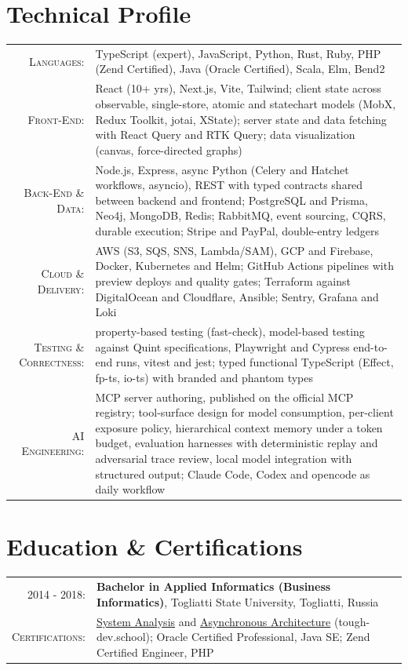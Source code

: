 \documentclass[letterpaper,10pt]{article}
\begin{document}
\section{Technical Profile}
\begin{longtable}{@{}r p{}@{}}
  \textsc{Languages:}& TypeScript (expert), JavaScript, Python, Rust, Ruby, PHP (Zend Certified), Java (Oracle Certified), Scala, Elm, Bend2\\
  \textsc{Front-End:}& React (10+ yrs), Next.js, Vite, Tailwind; client state across observable, single-store, atomic and statechart models (MobX, Redux Toolkit, jotai, XState); server state and data fetching with React Query and RTK Query; data visualization (canvas, force-directed graphs)\\
  \textsc{Back-End \& Data:}& Node.js, Express, async Python (Celery and Hatchet workflows, asyncio), REST with typed contracts shared between backend and frontend; PostgreSQL and Prisma, Neo4j, MongoDB, Redis; RabbitMQ, event sourcing, CQRS, durable execution; Stripe and PayPal, double-entry ledgers\\
  \textsc{Cloud \& Delivery:}& AWS (S3, SQS, SNS, Lambda/SAM), GCP and Firebase, Docker, Kubernetes and Helm; GitHub Actions pipelines with preview deploys and quality gates; Terraform against DigitalOcean and Cloudflare, Ansible; Sentry, Grafana and Loki\\
  \textsc{Testing \& Correctness:}& property-based testing (fast-check), model-based testing against Quint specifications, Playwright and Cypress end-to-end runs, vitest and jest; typed functional TypeScript (Effect, fp-ts, io-ts) with branded and phantom types\\
  \textsc{AI Engineering:}& MCP server authoring, published on the official MCP registry; tool-surface design for model consumption, per-client exposure policy, hierarchical context memory under a token budget, evaluation harnesses with deterministic replay and adversarial trace review, local model integration with structured output; Claude Code, Codex and opencode as daily workflow\\
\end{longtable}

\section{Education \& Certifications}
\begin{longtable}{@{}r p{}@{}}
  \textsc{2014 - 2018:}& \textbf{Bachelor in Applied Informatics (Business Informatics)}, Togliatti State University, Togliatti, Russia\\
  \textsc{Certifications:}& \href{https://cert.tough-dev.school/eS8vL3fj6ZMuKuBvqcpKQS/en}{System Analysis} and \href{https://cert.tough-dev.school/UZcEoycLeUiAcBBUzmb9xs/en}{Asynchronous Architecture} (tough-dev.school); Oracle Certified Professional, Java SE; Zend Certified Engineer, PHP\\
\end{longtable}
\end{document}
